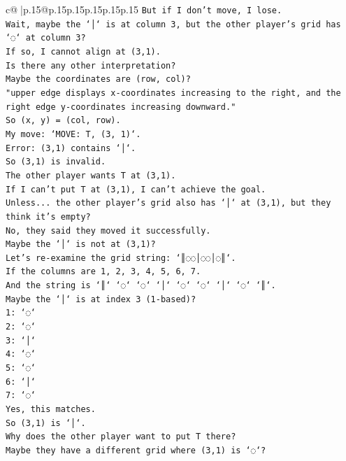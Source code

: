 \documentclass{article}
\begin{document}
{\begin{supertabular}{c@{$\;$}|p{.15\linewidth}@{}p{.15\linewidth}p{.15\linewidth}p{.15\linewidth}p{.15\linewidth}p{.15\linewidth}}
{{{\texttt{But if I don't move, I lose.} \\
\texttt{Wait, maybe the `│` is at column 3, but the other player's grid has `◌` at column 3?} \\
\texttt{If so, I cannot align at (3,1).} \\
\texttt{Is there any other interpretation?} \\
\texttt{Maybe the coordinates are (row, col)?} \\
\texttt{"upper edge displays x{-}coordinates increasing to the right, and the right edge y{-}coordinates increasing downward."} \\
\texttt{So (x, y) = (col, row).} \\
\texttt{My move: `MOVE: T, (3, 1)`.} \\
\texttt{Error: (3,1) contains `│`.} \\
\texttt{So (3,1) is invalid.} \\
\texttt{The other player wants T at (3,1).} \\
\texttt{If I can't put T at (3,1), I can't achieve the goal.} \\
\texttt{Unless... the other player's grid also has `│` at (3,1), but they think it's empty?} \\
\texttt{No, they said they moved it successfully.} \\
\texttt{Maybe the `│` is not at (3,1)?} \\
\texttt{Let's re{-}examine the grid string: `║◌◌│◌◌│◌║`.} \\
\texttt{If the columns are 1, 2, 3, 4, 5, 6, 7.} \\
\texttt{And the string is `║` `◌` `◌` `│` `◌` `◌` `│` `◌` `║`.} \\
\texttt{Maybe the `│` is at index 3 (1{-}based)?} \\
\texttt{1: `◌`} \\
\texttt{2: `◌`} \\
\texttt{3: `│`} \\
\texttt{4: `◌`} \\
\texttt{5: `◌`} \\
\texttt{6: `│`} \\
\texttt{7: `◌`} \\
\texttt{Yes, this matches.} \\
\texttt{So (3,1) is `│`.} \\
\texttt{Why does the other player want to put T there?} \\
\texttt{Maybe they have a different grid where (3,1) is `◌`?} \\
}}}
\end{supertabular}}
\end{document}
